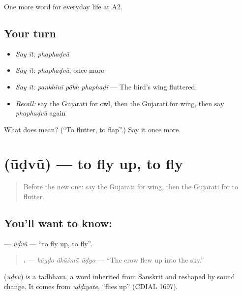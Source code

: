 \begin{grammarlens}[title={What you've built}]
One more word for everyday life at A2.
\end{grammarlens}

\subsection*{Your turn}
\begin{itemize}
\raggedright
  \item \emph{Say it:} \emph{phaphaḍvũ}
  \item \emph{Say it:} \emph{phaphaḍvũ}, once more
  \item \emph{Say it:} \emph{pankhīnī pā̃kh phaphaḍī} — The bird's wing fluttered.
  \item \emph{Recall:} say the Gujarati for owl, then the Gujarati for wing, then say \emph{phaphaḍvũ} again
\end{itemize}

\begin{tcolorbox}[breakable,colback=teal!4,colframe=teal!35!black,title={Before you move on}]
What does  mean? (\textquotedblleft{}To flutter, to flap\textquotedblright{}.) Say it once more.
\end{tcolorbox}
\section[\texorpdfstring{\gu{ઊડવું} (ūḍvũ)}{ઊડવું (ūḍvũ)}]{ (ūḍvũ) — to fly up, to fly}

\label{lesson:GU-C237-udvu}



\begin{quote}
Before the new one: say the Gujarati for wing, then the Gujarati for to flutter.
\end{quote}

\subsection*{You'll want to know: }
\textbf{} — \emph{ūḍvũ} — \textquotedblleft{}to fly up, to fly\textquotedblright{}.

\begin{quote}
\textbf{  .} — \emph{kāgḍo ākāśmā̃ ūḍyo} — \textquotedblleft{}The crow flew up into the sky.\textquotedblright{}
\end{quote}

\begin{cousinweb}
\textbf{} (\emph{ūḍvũ}) is a tadbhava, a word inherited from Sanskrit and reshaped by sound change. It comes from \emph{uḍḍīyate}, \textquotedblleft{}flies up\textquotedblright{} (CDIAL 1697).
\end{cousinweb}

